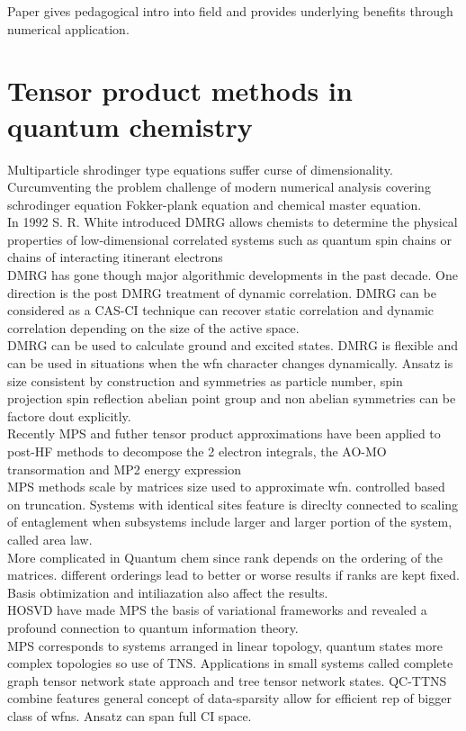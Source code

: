 \documentclass[10pt, draft]{article}
\begin{document}
 Paper gives pedagogical intro into field and provides underlying benefits through numerical application.  
 
 \section{Tensor product methods in quantum chemistry}
 
 Multiparticle shrodinger type equations suffer curse of dimensionality.  Curcumventing the problem challenge of modern numerical analysis covering schrodinger equation Fokker-plank equation and chemical master equation. \\
 In 1992 S. R. White introduced DMRG allows chemists to determine the physical properties of low-dimensional correlated systems such as quantum spin chains or chains of interacting itinerant electrons\\
 DMRG has gone though major algorithmic developments in the past decade. One direction is the post DMRG treatment of dynamic correlation. DMRG can be considered as a CAS-CI technique can recover static correlation and dynamic correlation depending on the size of the active space.  \\
 
 DMRG can be used to calculate ground and excited states.  DMRG is flexible and can be used in situations when the wfn character changes dynamically.  Ansatz is size consistent by construction and symmetries as particle number, spin projection spin reflection abelian point group and non abelian symmetries can be factore dout explicitly.  \\
 Recently MPS and futher tensor product approximations have been applied to post-HF methods to decompose the 2 electron integrals, the AO-MO transormation and MP2 energy expression\\
 
 MPS methods scale by matrices size used to approximate wfn.  controlled based on truncation.  Systems with identical sites feature is direclty connected to scaling of entaglement when subsystems include larger and larger portion of the system, called area law.  \\
 More complicated in Quantum chem since rank depends on the ordering of the matrices.  different orderings lead to better or worse results if ranks are kept fixed.  Basis obtimization and intiliazation also affect the results.  \\
 
 HOSVD have made MPS the basis of variational frameworks and revealed a profound connection to quantum information theory. \\
 MPS corresponds to systems arranged in linear topology, quantum states more complex topologies so use of TNS.  Applications in small systems called complete graph tensor network state approach and tree tensor network states.  QC-TTNS combine  features general concept of data-sparsity allow for efficient rep of bigger class of wfns.  Ansatz can span full CI space. 
 
\end{document}
